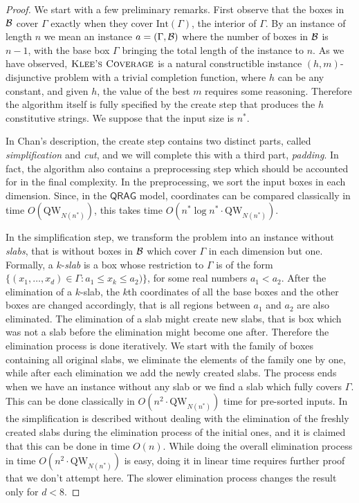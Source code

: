 \documentclass[12pt]{article}
\newcommand{\qw}{\mathrm{QW}}
\newcommand{\Int}[1]{\mathrm{Int}(#1)}
\newcommand{\KCf}{\textsc{Klee's Coverage}}
\theoremstyle{definition}
\begin{document}
\begin{proof}
We start with a few preliminary remarks. First observe that the boxes in $\cal B$ cover $\Gamma$ exactly when they cover $\Int{\Gamma}$, the interior of $\Gamma$.
By an instance of length $n$ we mean an instance $a = (\Gamma, {\cal B})$ where the number of boxes in $\cal B$ is $n-1$, with the base box $\Gamma$ bringing the total length of the instance to $n$.
As we have observed, $\KCf$ is a natural constructible instance $(h,m)$-disjunctive problem with a trivial completion function, where $h$ can be any constant, and given $h$, the value of the best $m$ requires some reasoning. 
Therefore the algorithm itself is fully specified by the create step that produces the $h$ constitutive strings. We suppose that the input size is $n^*$. 

In Chan's description, the create step contains two distinct parts, called {\em simplification} and {\em cut}, and we will complete this with a third part, {\em padding}.
In fact, the algorithm also contains a preprocessing step which should be accounted for in the final complexity.
In the preprocessing, we sort the input boxes in each dimension. Since, in the $\mathsf{QRAG}$ model, coordinates can be compared classically in time $O(\qw_{N(n^*)})$, this takes time $O(n^* \log n^* \cdot \qw_{N(n^*)})$.

In the simplification step, we transform the problem into an instance without {\em slabs}, that is without boxes in $\cal B$ which cover $\Gamma$ in each dimension but one.
Formally, a $k$-{\em slab} is a box whose restriction to $\Gamma$ is of the form $\{(x_1, \ldots , x_d) \in \Gamma : a_1 \leq x_k \leq a_2)\}$, for some real numbers $a_1 < a_2$. After the elimination of a $k$-slab, the $k$th coordinates of all the base boxes and the other boxes are changed accordingly, that is all regions between $a_1$ and $a_2$ are also eliminated.
The elimination of a slab might create new slabs, that is box which was not a slab before the elimination might become one after.
Therefore the elimination process is done iteratively. We start with the family of boxes containing all original slabs, we eliminate the elements of the family one by one, while after each elimination we add the newly created slabs. The process ends when we have an instance without any slab or we find a slab which fully covers $\Gamma$.
This can be done classically in $O(n^2 \cdot \qw_{N(n^*)})$ time for pre-sorted inputs.
In~\cite{Chan13} the simplification is described without dealing with the elimination of the freshly created slabs during the elimination process of the initial ones, and it is claimed that this can be done in time $O(n)$. While doing the overall elimination process in time $O(n^2 \cdot \qw_{N(n^*)})$ is easy, doing it in linear time requires further proof that we don't attempt here.
The slower elimination process changes the result only for $d<8$.


\end{proof}
\end{document}
